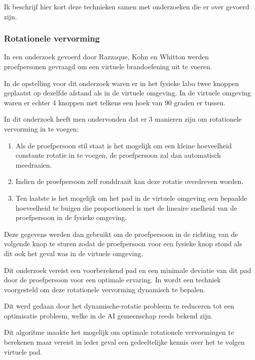 \documentclass[a4paper,12pt]{article}
\begin{document}
Ik beschrijf hier kort deze technieken samen met onderzoeken die er over gevoerd
zijn.


\subsubsection{Rotationele vervorming}
In een onderzoek gevoerd door Razzaque, Kohn en Whitton \cite{kohn01} werden 
proefpersonen gevraagd om een virtuele brandoefening uit te voeren.

In de opstelling voor dit onderzoek waren er in het fysieke labo twee knoppen
geplaatst op dezelfde afstand als in de virtuele omgeving. In de virtuele
omgeving waren er echter 4 knoppen met telkens een hoek van 90 graden er tussen.

In dit onderzoek heeft men ondervonden dat er 3 manieren zijn om rotationele
vervorming in te voegen:

\begin{enumerate}
    \item Als de proefpersoon stil staat is het mogelijk om een kleine 
        hoeveelheid constante rotatie in te voegen, de proefpersoon zal dan 
        automatisch meedraaien.
    \item Indien de proefpersoon zelf ronddraait kan deze rotatie overdreven 
        worden.
    \item Ten laatste is het mogelijk om het pad in de virtuele omgeving een
        bepaalde hoeveelheid te buigen die proportioneel is met de lineaire
        snelheid van de proefpersoon in de fysieke omgeving.
\end{enumerate}

Deze gegevens werden dan gebruikt om de proefpersoon in de richting van de 
volgende knop te sturen zodat de proefpersoon voor een fysieke knop stond als dit 
ook het geval was in de virtuele omgeving.

Dit onderzoek vereist een voorberekend pad en een minimale deviatie van dit pad 
door de proefpersoon voor een optimale ervaring. In \cite{engel08} wordt een 
techniek voorgesteld om deze rotationele vervorming dynamisch te bepalen.

Dit werd gedaan door het dynamische-rotatie probleem te reduceren tot een 
optimisatie probleem, welke in de AI gemeenschap reeds bekend zijn.

Dit algoritme maakte het mogelijk om optimale rotationele vervormingen te 
berekenen maar vereist in ieder geval een gedeeltelijke kennis over het te volgen
virtuele pad.
\end{document}
